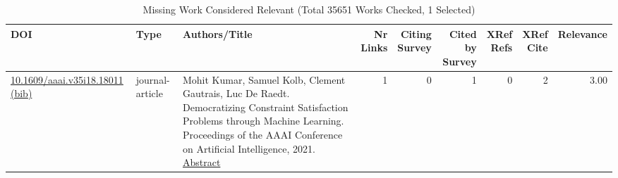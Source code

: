 {\scriptsize
\begin{longtable}{p{5cm}lp{11cm}rrrrrr}
\caption{Missing Work Considered Relevant (Total 35651 Works Checked, 1 Selected)}\\ \toprule
DOI & Type & Authors/Title & \shortstack{Nr\\Links} & \shortstack{Citing\\Survey} & \shortstack{Cited by\\Survey} & \shortstack{XRef\\Refs} & \shortstack{XRef\\Cite} & Relevance\\ \midrule\endhead
\bottomrule
\endfoot
\href{http://dx.doi.org/10.1609/aaai.v35i18.18011}{10.1609/aaai.v35i18.18011} \href{https://www.doi2bib.org/bib/10.1609/aaai.v35i18.18011}{(bib)} & journal-article & Mohit Kumar, Samuel Kolb, Clement Gautrais, Luc De Raedt. Democratizing Constraint Satisfaction Problems through Machine Learning. Proceedings of the AAAI Conference on Artificial Intelligence, 2021. \hyperref[mw:mw26]{Abstract} & 1 & 0 & 1 & 0 & 2 &  3.00\\
\end{longtable}
}


